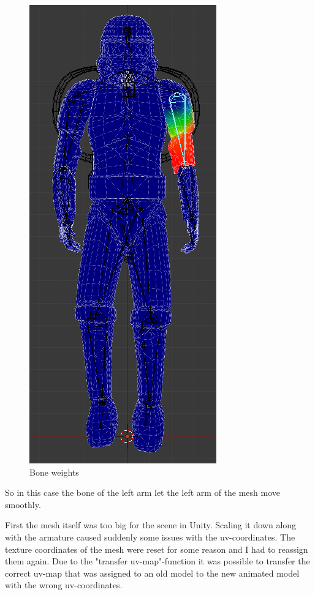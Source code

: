 \documentclass[12pt, letterpaper]{scrartcl}
\begin{document}
	\begin{figure}[H]
		\centering
		\includegraphics[scale=.5]{images//alpha/boneWeights}
		\caption{Bone weights}
	\end{figure}
	So in this case the bone of the left arm let the left arm of the mesh move smoothly.
	
	First the mesh itself was too big for the scene in Unity. Scaling it down along with the armature caused suddenly some issues with the uv-coordinates. The texture coordinates of the mesh were reset for some reason and I had to reassign them again. Due to the "transfer uv-map"-function it was possible to transfer the correct uv-map that was assigned to an old model to the new animated model with the wrong uv-coordinates.
	
\end{document}

